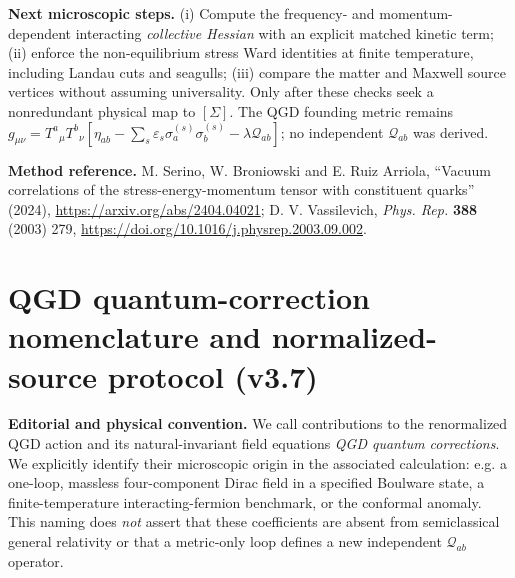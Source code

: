 \documentclass[11pt,a4paper]{article}
\theoremstyle{remark}\newtheorem{remark}[theorem]{Remark}
\begin{document}
\textbf{Next microscopic steps.} (i) Compute the frequency- and momentum-dependent interacting \emph{collective Hessian} with an explicit matched kinetic term; (ii) enforce the non-equilibrium stress Ward identities at finite temperature, including Landau cuts and seagulls; (iii) compare the matter and Maxwell source vertices without assuming universality. Only after these checks seek a nonredundant physical map to $[\Sigma]$. The QGD founding metric remains $g_{\mu\nu}=T^a{}_{\mu}T^b{}_{\nu}[\eta_{ab}-\sum_s\varepsilon_s\sigma_a^{(s)}\sigma_b^{(s)}-\lambda\mathcal Q_{ab}]$; no independent $\mathcal Q_{ab}$ was derived.

\smallskip\noindent\textbf{Method reference.} M. Serino, W. Broniowski and E. Ruiz Arriola, ``Vacuum correlations of the stress-energy-momentum tensor with constituent quarks'' (2024), \url{https://arxiv.org/abs/2404.04021}; D. V. Vassilevich, \emph{Phys. Rep.} \textbf{388} (2003) 279, \url{https://doi.org/10.1016/j.physrep.2003.09.002}.


\clearpage
\section{QGD quantum-correction nomenclature and normalized-source protocol (v3.7)}\label{sec:v37-qgd-norm}
\textbf{Editorial and physical convention.} We call contributions to the renormalized QGD action and its natural-invariant field equations \emph{QGD quantum corrections}. We explicitly identify their microscopic origin in the associated calculation: e.g. a one-loop, massless four-component Dirac field in a specified Boulware state, a finite-temperature interacting-fermion benchmark, or the conformal anomaly. This naming does \emph{not} assert that these coefficients are absent from semiclassical general relativity or that a metric-only loop defines a new independent $\mathcal Q_{ab}$ operator.
\end{document}
